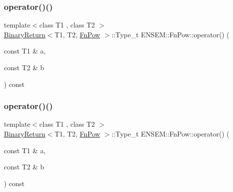 \subsubsection{\texorpdfstring{operator()()}{operator()()}\hspace{0.1cm}{\footnotesize\ttfamily [1/3]}}
{\footnotesize\ttfamily template$<$class T1 , class T2 $>$ \\
\mbox{\hyperlink{structENSEM_1_1BinaryReturn}{Binary\+Return}}$<$T1, T2, \mbox{\hyperlink{structENSEM_1_1FnPow}{Fn\+Pow}} $>$\+::Type\+\_\+t E\+N\+S\+E\+M\+::\+Fn\+Pow\+::operator() (\begin{DoxyParamCaption}\item[{const T1 \&}]{a,  }\item[{const T2 \&}]{b }\end{DoxyParamCaption}) const\hspace{0.3cm}{\ttfamily [inline]}}

\mbox{\label{structENSEM_1_1FnPow_ad7f15cdc82e84e8bd8e07a4bc8dcb633}} 
\subsubsection{\texorpdfstring{operator()()}{operator()()}\hspace{0.1cm}{\footnotesize\ttfamily [2/3]}}
{\footnotesize\ttfamily template$<$class T1 , class T2 $>$ \\
\mbox{\hyperlink{structENSEM_1_1BinaryReturn}{Binary\+Return}}$<$T1, T2, \mbox{\hyperlink{structENSEM_1_1FnPow}{Fn\+Pow}} $>$\+::Type\+\_\+t E\+N\+S\+E\+M\+::\+Fn\+Pow\+::operator() (\begin{DoxyParamCaption}\item[{const T1 \&}]{a,  }\item[{const T2 \&}]{b }\end{DoxyParamCaption}) const\hspace{0.3cm}{\ttfamily [inline]}}

\mbox{\label{structENSEM_1_1FnPow_ad7f15cdc82e84e8bd8e07a4bc8dcb633}} 
